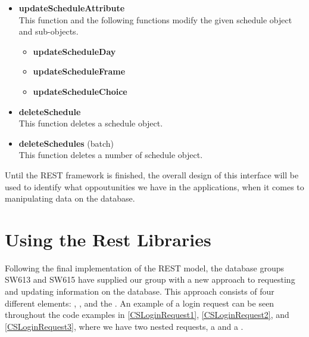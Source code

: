 \begin{itemize}
\begin{itemize}
    \end{itemize}
    \item \textbf{updateScheduleAttribute}\\
    This function and the following functions modify the given schedule object and sub-objects.
    \begin{itemize}
        \item \textbf{updateScheduleDay}
        \item \textbf{updateScheduleFrame}
        \item \textbf{updateScheduleChoice}
    \end{itemize}
    \item \textbf{deleteSchedule}\\
    This function deletes a schedule object.
    \item \textbf{deleteSchedules} (batch)\\
    This function deletes a number of schedule object.
\end{itemize}

Until the REST framework is finished, the overall design of this interface
will be used to identify what oppoutunities we have in the applications, when it
comes to manipulating data on the database.

\section{Using the Rest Libraries}\label{UsingRest}
Following the final implementation of the REST model, the database groups SW613
and SW615 have supplied our group with a new approach to requesting and updating
information on the database. This approach consists of four different
elements: , , 
and the . An example of a login request can be seen throughout the
code examples in \autoref{CSLoginRequest1}, \autoref{CSLoginRequest2}, and
\autoref{CSLoginRequest3}, where we have two nested requests, a
 and a .\nl

